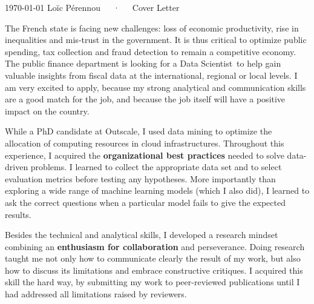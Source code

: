 \documentclass[11pt, a4paper]{awesome-cv}
\newcommand{\job}{Data Scientist}
\begin{document}
\makecvheader[R]

\makecvfooter
  {\today}
  {Loïc Pérennou~~~·~~~Cover Letter}
  {}

\makelettertitle

\begin{cvletter}
  The French state is facing new challenges: loss of economic productivity, rise in inequalities and mis-trust in the government. 
  It is thus critical to optimize public spending, tax collection and fraud detection to remain a competitive economy. The public finance department is looking for a \job~to help gain valuable insights from fiscal data at the international, regional or local levels. I am very excited to apply, because my strong analytical and communication skills are a good match for the job, and because the job itself will have a positive impact on the country. 

While a PhD candidate at Outscale, I used data mining to optimize the allocation of computing resources in cloud infrastructures. 
Throughout this experience, I acquired the \textbf{organizational best practices} needed to solve data-driven problems.  
I learned to collect the appropriate data set and to select evaluation metrics before testing any hypotheses. 
More importantly than exploring a wide range of machine learning models (which I also did), I learned to ask the correct questions when a particular model fails to give the expected results.  

Besides the technical and analytical skills, I developed a research mindset combining an \textbf{enthusiasm for collaboration} and perseverance.  
Doing research taught me not only how to communicate clearly the result of my work, but also how to discuss its limitations and embrace constructive critiques.  
I acquired this skill the hard way, by submitting my work to peer-reviewed publications until I had addressed all limitations raised by reviewers. 



\end{cvletter}
\end{document}
